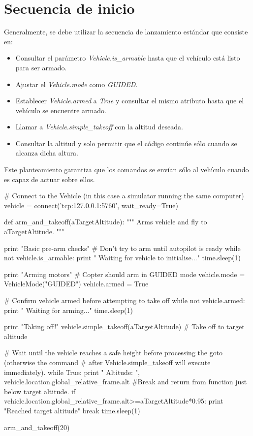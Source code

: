  
\section{Secuencia de inicio}

Generalmente, se debe utilizar la secuencia de lanzamiento estándar que consiste en:

\begin{itemize}
\item Consultar el parámetro \textit{Vehicle.is\_armable} hasta que el vehículo está listo para ser armado.
\item Ajustar el \textit{Vehicle.mode} como \textit{GUIDED}.
\item Establecer \textit{Vehicle.armed} a \textit{True} y consultar el mismo atributo hasta que el vehículo se encuentre armado.
\item Llamar a \textit{Vehicle.simple\_takeoff} con la altitud deseada.
\item Consultar la altitud y solo permitir que el código continúe sólo cuando se alcanza dicha altura.
\end{itemize}

Este planteamiento garantiza que los comandos se envían sólo al vehículo cuando es capaz de actuar sobre ellos.
\clearpage

\begin{listing}[
 float=h!,
 language = Python,
 caption = {Secuencia de inicio},
 label  = code:despegue]
# Connect to the Vehicle (in this case a simulator running the same computer)
vehicle = connect('tcp:127.0.0.1:5760', wait_ready=True)

def arm_and_takeoff(aTargetAltitude):
    """
    Arms vehicle and fly to aTargetAltitude.
    """

    print "Basic pre-arm checks"
    # Don't try to arm until autopilot is ready
    while not vehicle.is_armable:
        print " Waiting for vehicle to initialise..."
        time.sleep(1)

    print "Arming motors"
    # Copter should arm in GUIDED mode
    vehicle.mode    = VehicleMode("GUIDED")
    vehicle.armed   = True

    # Confirm vehicle armed before attempting to take off
    while not vehicle.armed:
        print " Waiting for arming..."
        time.sleep(1)

    print "Taking off!"
    vehicle.simple_takeoff(aTargetAltitude) # Take off to target altitude

    # Wait until the vehicle reaches a safe height before processing the goto (otherwise the command
    #  after Vehicle.simple_takeoff will execute immediately).
    while True:
        print " Altitude: ", vehicle.location.global_relative_frame.alt
        #Break and return from function just below target altitude.
        if vehicle.location.global_relative_frame.alt>=aTargetAltitude*0.95:
            print "Reached target altitude"
            break
        time.sleep(1)

arm_and_takeoff(20)
\end{listing}

